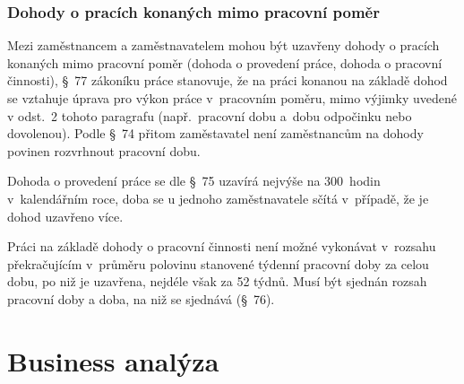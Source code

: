 \documentclass[twoside]{ctuthesis}
\begin{document}
\subsection{Dohody o pracích konaných mimo pracovní poměr}
Mezi zaměstnancem a zaměstnavatelem mohou být uzavřeny dohody o pracích konaných mimo pracovní poměr (dohoda o provedení práce, dohoda o pracovní činnosti), §~77 zákoníku práce stanovuje, že na práci konanou na základě dohod se vztahuje úprava pro výkon práce v~pracovním poměru, mimo výjimky uvedené v odst.~2 tohoto paragrafu (např.~pracovní dobu a~dobu odpočinku nebo dovolenou). Podle §~74 přitom zaměstavatel není zaměstnancům na dohody povinen rozvrhnout pracovní dobu.

Dohoda o provedení práce se dle §~75 uzavírá nejvýše na 300~hodin v~kalendářním roce, doba se u jednoho zaměstnavatele sčítá v~případě, že je dohod uzavřeno více.

Práci na základě dohody o pracovní činnosti není možné vykonávat v~rozsahu překračujícím v~průměru polovinu stanovené týdenní pracovní doby za celou dobu, po niž je uzavřena, nejdéle však za 52 týdnů. Musí být sjednán rozsah pracovní doby a doba, na niž se sjednává (§~76).

\chapter{Business analýza}

\end{document}
